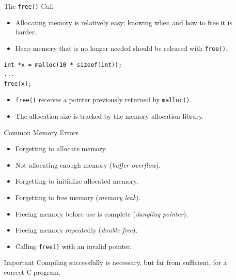 \begin{frame}[fragile]{The \texttt{free()} Call}
    \begin{itemize}
        \item Allocating memory is relatively easy;
              knowing when and how to free it is harder.
        \item Heap memory that is no longer needed should be
              released with \texttt{free()}.
    \end{itemize}

\begin{verbatim}
int *x = malloc(10 * sizeof(int));
...
free(x);
\end{verbatim}

    \begin{itemize}
        \item \texttt{free()} receives a pointer previously
              returned by \texttt{malloc()}.
        \item The allocation size is tracked by the
              memory-allocation library.
    \end{itemize}
\end{frame}


\begin{frame}{Common Memory Errors}
    \begin{itemize}
        \item Forgetting to allocate memory.
        \item Not allocating enough memory (\emph{buffer overflow}).
        \item Forgetting to initialize allocated memory.
        \item Forgetting to free memory (\emph{memory leak}).
        \item Freeing memory before use is complete
              (\emph{dangling pointer}).
        \item Freeing memory repeatedly (\emph{double free}).
        \item Calling \texttt{free()} with an invalid pointer.
    \end{itemize}

    \begin{alertblock}{Important}
        Compiling successfully is necessary, but far from sufficient,
        for a correct C program.
    \end{alertblock}
\end{frame}


